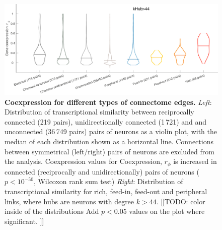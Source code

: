 \documentclass[10pt,letterpaper]{article}
\begin{document}
\begin{figure}[h]
\centering
    \includegraphics[width=1\textwidth]{distributionsALL.pdf}
    \caption{
\textbf{Coexpression for different types of connectome edges.}
\emph{Left}: Distribution of transcriptional similarity between reciprocally connected (219 pairs), unidirectionally connected (1\,721) and  and unconnected (36\,749 pairs) pairs of neurons as a violin plot, with the median of each distribution shown as a horizontal line.
Connections between symmetrical (left/right) pairs of neurons are excluded from the analysis. Coexpression values for
Coexpression, $r_\phi$ is increased in connected (reciprocally and unidirectionally) pairs of neurons ($p < 10^{-50}$, Wilcoxon rank sum test)
\emph{Right}: Distribution of transcriptional similarity for rich, feed-in, feed-out and peripheral links, where hubs are neurons with degree $k>44$.
[[TODO: color inside of the distributions
Add $p<0.05$ values on the plot where significant.
]]
\label{fig:S_RFPdistributions}
}
\end{figure}
\end{document}
